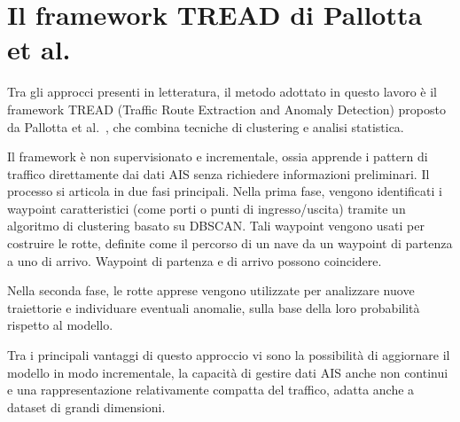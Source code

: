 \section{Il framework TREAD di Pallotta et al.}
\label{sec:tread}

Tra gli approcci presenti in letteratura, il metodo adottato in questo lavoro è il framework TREAD 
(Traffic Route Extraction and Anomaly Detection) proposto da Pallotta et al.~\cite{pallotta}, 
che combina tecniche di clustering e analisi statistica.

Il framework è non supervisionato e incrementale, ossia apprende i pattern di traffico direttamente dai dati AIS 
senza richiedere informazioni preliminari. Il processo si articola in due fasi principali. 
Nella prima fase, vengono identificati i waypoint caratteristici (come porti o punti di ingresso/uscita) 
tramite un algoritmo di clustering basato su DBSCAN. Tali waypoint vengono usati per costruire le rotte, definite
come il percorso di un nave da un waypoint di partenza a uno di arrivo. Waypoint di partenza e di arrivo possono coincidere.

Nella seconda fase, le rotte apprese vengono utilizzate per analizzare nuove traiettorie e 
individuare eventuali anomalie, sulla base della loro probabilità rispetto al modello.

Tra i principali vantaggi di questo approccio vi sono la possibilità di aggiornare il modello in modo 
incrementale, la capacità di gestire dati AIS anche non continui e una rappresentazione relativamente 
compatta del traffico, adatta anche a dataset di grandi dimensioni.